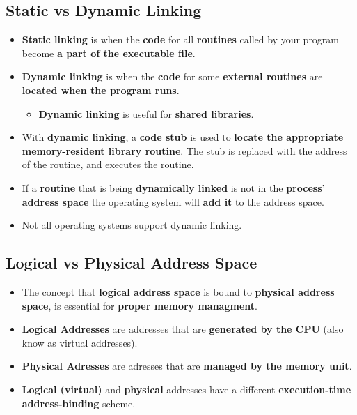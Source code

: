 \documentclass{article}
\begin{document}
    \subsection*{Static vs Dynamic Linking}
    \begin{itemize}
        \item \textbf{Static linking} is when the \textbf{code} for all \textbf{routines} called by your program become \textbf{a part of the executable file}. 
        \item \textbf{Dynamic linking} is when the \textbf{code} for some \textbf{external routines} are \textbf{located when the program runs}.
        \begin{itemize}
            \item \textbf{Dynamic linking} is useful for \textbf{shared libraries}.
        \end{itemize}
        \item With \textbf{dynamic linking}, a \textbf{code stub} is used to \textbf{locate the appropriate memory-resident library routine}. The stub is replaced with the address of the routine, and executes the routine.
        \item If a \textbf{routine} that is being \textbf{dynamically linked} is not in the \textbf{process' address space} the operating system will \textbf{add it} to the address space.
        \item Not all operating systems support dynamic linking.
    \end{itemize}

    \subsection*{Logical vs Physical Address Space}
    \begin{itemize}
        \item The concept that \textbf{logical address space} is bound to \textbf{physical address space}, is essential for \textbf{proper memory managment}.
        \item \textbf{Logical Addresses} are addresses that are \textbf{generated by the CPU} (also know as virtual addresses).
        \item \textbf{Physical Adresses} are adresses that are \textbf{managed by the memory unit}.
        \item \textbf{Logical (virtual)} and \textbf{physical} addresses have a different \textbf{execution-time address-binding} scheme.
    \end{itemize}
\end{document}
